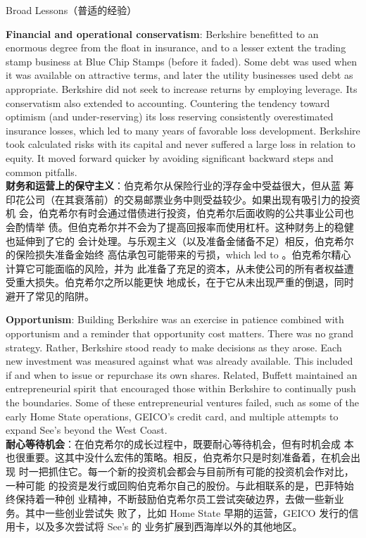 \begin{section}{Broad Lessons（普适的经验）}
\begin{verseparallel}
  {
    \textbf{Financial and operational conservatism}: Berkshire benefitted to an
    enormous degree from the float in insurance, and to a lesser extent the
    trading stamp business at Blue Chip Stamps (before it faded). Some debt was
    used when it was available on attractive terms, and later the utility
    businesses used debt as appropriate. Berkshire did not seek to increase
    returns by employing leverage. Its conservatism also extended to accounting.
    Countering the tendency toward optimism (and under-reserving) its loss
    reserving consistently overestimated insurance losses, which led to many
    years of favorable loss development. Berkshire took calculated risks with
    its capital and never suffered a large loss in relation to equity. It moved
    forward quicker by avoiding significant backward steps and common pitfalls. \\
  }
  {
    \textbf{财务和运营上的保守主义}：伯克希尔从保险行业的浮存金中受益很大，但从蓝
    筹印花公司（在其衰落前）的交易邮票业务中则受益较少。如果出现有吸引力的投资机
    会，伯克希尔有时会通过借债进行投资，伯克希尔后面收购的公共事业公司也会酌情举
    债。但伯克希尔并不会为了提高回报率而使用杠杆。这种财务上的稳健也延伸到了它的
    会计处理。与乐观主义（以及准备金储备不足）相反，伯克希尔的保险损失准备金始终
    高估承包可能带来的亏损，which led to 。伯克希尔精心计算它可能面临的风险，并为
    此准备了充足的资本，从未使公司的所有者权益遭受重大损失。伯克希尔之所以能更快
    地成长，在于它从未出现严重的倒退，同时避开了常见的陷阱。
  }
\end{verseparallel}

\begin{verseparallel}
  {
    \textbf{Opportunism}: Building Berkshire was an exercise in patience
    combined with opportunism and a reminder that opportunity cost matters.
    There was no grand strategy. Rather, Berkshire stood ready to make decisions
    as they arose. Each new investment was measured against what was already
    available. This included if and when to issue or repurchase its own shares.
    Related, Buffett maintained an entrepreneurial spirit that encouraged those
    within Berkshire to continually push the boundaries. Some of these
    entrepreneurial ventures failed, such as some of the early Home State
    operations, GEICO's credit card, and multiple attempts to expand See's
    beyond the West Coast. \\
  }
  {
    \textbf{耐心等待机会}：在伯克希尔的成长过程中，既要耐心等待机会，但有时机会成
    本也很重要。这其中没什么宏伟的策略。相反，伯克希尔只是时刻准备着，在机会出现
    时一把抓住它。每一个新的投资机会都会与目前所有可能的投资机会作对比，一种可能
    的投资是发行或回购伯克希尔自己的股份。与此相联系的是，巴菲特始终保持着一种创
    业精神，不断鼓励伯克希尔员工尝试突破边界，去做一些新业务。其中一些创业尝试失
    败了，比如 Home State 早期的运营，GEICO 发行的信用卡，以及多次尝试将 See's 的
    业务扩展到西海岸以外的其他地区。
  }
\end{verseparallel}


\end{section}
